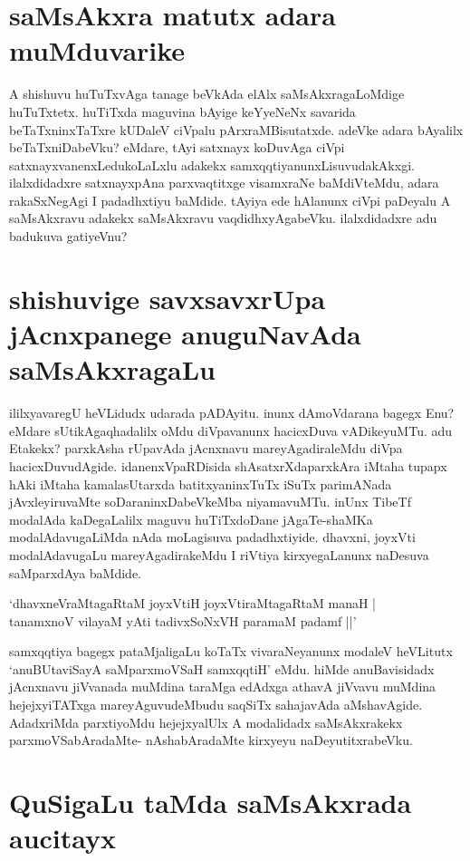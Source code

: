 \section*{saMsAkxra matutx adara muMduvarike}

A shishuvu huTuTxvAga tanage beVkAda elAlx saMsAkxragaLoMdige huTuTxtetx. huTiTxda maguvina bAyige keYyeNeNx savarida beTaTxninxTaTxre kUDaleV ciVpalu pArxraMBisutatxde. adeVke adara bAyalilx beTaTxniDabeVku? eMdare, tAyi satxnayx koDuvAga ciVpi satxnayxvanenxLedukoLaLxlu adakekx samxqqtiyanunxLisuvudakAkxgi. ilalxdidadxre satxnayxpAna parxvaqtitxge visamxraNe baMdiVteMdu, adara rakaSxNegAgi I padadhxtiyu baMdide. tAyiya ede hAlanunx ciVpi paDeyalu A saMsAkxravu adakekx saMsAkxravu vaqdidhxyAgabeVku. ilalxdidadxre adu badukuva gatiyeVnu?

\section*{shishuvige savxsavxrUpa jAcnxpanege anuguNavAda saMsAkxragaLu}

ililxyavaregU heVLidudx udarada pADAyitu. inunx dAmoVdarana bagegx Enu? eMdare sUtikAgaqhadalilx oMdu diVpavanunx hacicxDuva vADikeyuMTu. adu Etakekx? parxkAsha rUpavAda jAcnxnavu mareyAgadiraleMdu diVpa hacicxDuvudAgide. idanenxVpaRDisida shAsatxrXdaparxkAra iMtaha tupapx hAki iMtaha kamalasUtarxda batitxyaninxTuTx iSuTx parimANada jAvxleyiruvaMte soDaraninxDabeVkeMba niyamavuMTu. inUnx TibeTf modalAda kaDegaLalilx maguvu huTiTxdoDane jAgaTe-shaMKa modalAdavugaLiMda nAda moLagisuva padadhxtiyide. dhavxni, joyxVti modalAdavugaLu mareyAgadirakeMdu I riVtiya kirxyegaLanunx naDesuva saMparxdAya baMdide.

\begin{shloka}
`dhavxneVraMtagaRtaM joyxVtiH joyxVtiraMtagaRtaM manaH |\label{87}\\
tanamxnoV vilayaM yAti tadivxSoNxVH paramaM padamf ||'
\end{shloka}

samxqqtiya bagegx pataMjaligaLu koTaTx vivaraNeyanunx modaleV heVLitutx `anuBUtaviSayA saMparxmoVSaH samxqqtiH' eMdu. hiMde anuBavisidadx jAcnxnavu jiVvanada muMdina taraMga edAdxga athavA jiVvavu muMdina hejejxyiTATxga mareyAguvudeMbudu saqSiTx sahajavAda aMshavAgide. AdadxriMda parxtiyoMdu hejejxyalUlx A modalidadx saMsAkxrakekx  parxmoVSabAradaMte- nAshabAradaMte kirxyeyu naDeyutitxrabeVku.

\section*{QuSigaLu taMda saMsAkxrada aucitayx}

